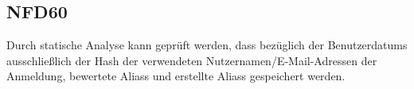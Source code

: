 \subsection*{NFD60}
Durch \gls{statische Analyse} kann geprüft werden, dass bezüglich der \Glspl{Benutzerdatum} ausschließlich der \Gls{Hash} der verwendeten Nutzernamen/E-Mail-Adressen der Anmeldung, bewertete \Glspl{Alias} und erstellte \Glspl{Alias} gespeichert werden.